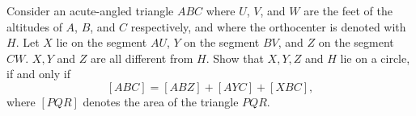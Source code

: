 Consider an acute-angled triangle $ABC$ where $U$, $V$, and $W$ are the feet of
the altitudes of $A$, $B$, and $C$ respectively, and where the orthocenter is denoted with $H$. 
Let $X$ lie on the segment $AU$, $Y$ on the segment $BV$, and $Z$ on the segment $CW$.
$X,Y$ and $Z$ are all different from $H$. Show that $X,Y,Z$ and $H$ lie on a circle, if and only if
$$[ABC] = [ABZ] + [AYC] + [XBC],$$
where $[PQR]$ denotes the area of the triangle $PQR$.
